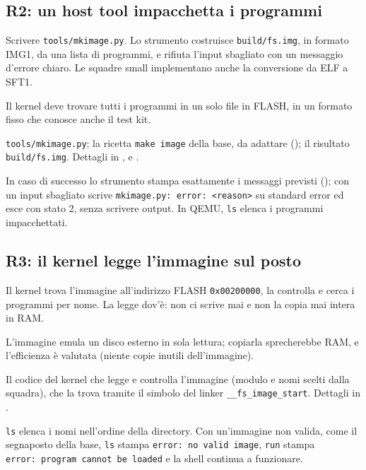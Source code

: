 \subsection{R2: un host tool impacchetta i programmi}
\begin{description}\sloppy
    \item[Che cosa chiede] Scrivere \texttt{tools/mkimage.py}. Lo strumento costruisce \texttt{build/fs.img}, in formato IMG1, da una lista di programmi, e rifiuta l'input sbagliato con un messaggio d'errore chiaro. Le squadre small implementano anche la conversione da ELF a SFT1.
    \item[Perché serve] Il kernel deve trovare tutti i programmi in un solo file in FLASH, in un formato fisso che conosce anche il test kit.
    \item[Dove si interviene] \texttt{tools/mkimage.py}; la ricetta \texttt{make image} della base, da adattare (); il risultato \texttt{build/fs.img}. Dettagli in ,  e .
    \item[Come si verifica] In caso di successo lo strumento stampa esattamente i messaggi previsti (); con un input sbagliato scrive \texttt{mkimage.py:\ error:\ <reason>} su standard error ed esce con stato 2, senza scrivere output. In QEMU, \texttt{ls} elenca i programmi impacchettati.
\end{description}

\subsection{R3: il kernel legge l'immagine sul posto}
\begin{description}\sloppy
    \item[Che cosa chiede] Il kernel trova l'immagine all'indirizzo FLASH \texttt{0x00200000}, la controlla e cerca i programmi per nome. La legge dov'è: non ci scrive mai e non la copia mai intera in RAM.
    \item[Perché serve] L'immagine emula un disco esterno in sola lettura; copiarla sprecherebbe RAM, e l'efficienza è valutata (niente copie inutili dell'immagine).
    \item[Dove si interviene] Il codice del kernel che legge e controlla l'immagine (modulo e nomi scelti dalla squadra), che la trova tramite il simbolo del linker \texttt{\_\_fs\_image\_start}. Dettagli in .
    \item[Come si verifica] \texttt{ls} elenca i nomi nell'ordine della directory. Con un'immagine non valida, come il segnaposto della base, \texttt{ls} stampa \texttt{error:\ no valid image}, \texttt{run} stampa \texttt{error:\ program cannot be loaded} e la shell continua a funzionare.
\end{description}

